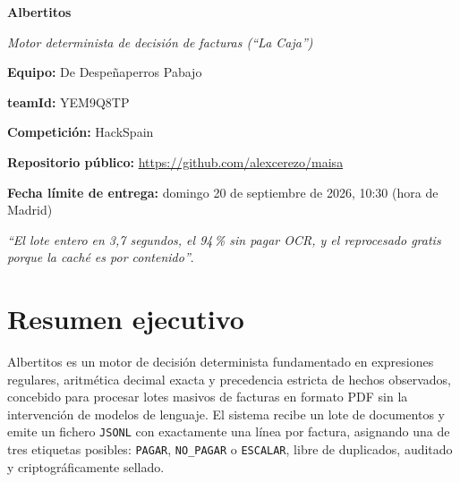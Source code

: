 \documentclass[11pt,a4paper]{article}
\begin{document}
\begin{titlepage}
    \centering
    \vspace*{3.5cm}
    {\Huge \bfseries Albertitos \par}
    \vspace{0.6cm}
    {\Large \textit{Motor determinista de decisión de facturas (``La Caja'')} \par}
    
    \vspace{2.5cm}
    {\large \textbf{Equipo:} De Despeñaperros Pabajo \par}
    {\large \textbf{teamId:} YEM9Q8TP \par}
    {\large \textbf{Competición:} HackSpain \par}
    
    \vspace{1.5cm}
    {\large \textbf{Repositorio público:} \url{https://github.com/alexcerezo/maisa} \par}
    {\large \textbf{Fecha límite de entrega:} domingo 20 de septiembre de 2026, 10:30 (hora de Madrid) \par}
    
    \vfill
    \begin{minipage}{0.85\textwidth}
        \centering
        \textit{``El lote entero en 3,7 segundos, el 94\,\% sin pagar OCR, y el reprocesado gratis porque la caché es por contenido''}.
    \end{minipage}
    \vspace{1.5cm}
\end{titlepage}

\tableofcontents
\newpage

\setcounter{section}{1}

\section{Resumen ejecutivo}

Albertitos es un motor de decisión determinista fundamentado en expresiones regulares, aritmética decimal exacta y precedencia estricta de hechos observados, concebido para procesar lotes masivos de facturas en formato PDF sin la intervención de modelos de lenguaje. El sistema recibe un lote de documentos y emite un fichero \texttt{JSONL} con exactamente una línea por factura, asignando una de tres etiquetas posibles: \texttt{PAGAR}, \texttt{NO\_PAGAR} o \texttt{ESCALAR}, libre de duplicados, auditado y criptográficamente sellado.
\end{document}
